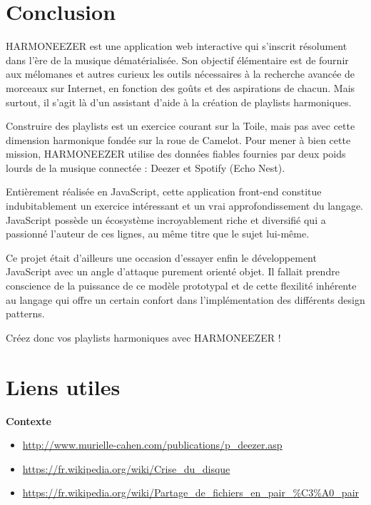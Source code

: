 \documentclass[a4paper,12pt]{article}
\begin{document}
\part*{Conclusion}

HARMONEEZER est une application web interactive qui s'inscrit résolument dans l'ère de la musique dématérialisée. Son objectif élémentaire est de fournir aux mélomanes et autres curieux les outils nécessaires à la recherche avancée de morceaux sur Internet, en fonction des goûts et des aspirations de chacun. Mais surtout, il s'agit là d'un assistant d'aide à la création de playlists harmoniques.

Construire des playlists est un exercice courant sur la Toile, mais pas avec cette dimension harmonique fondée sur la roue de Camelot. Pour mener à bien cette mission, HARMONEEZER utilise des données fiables fournies par deux poids lourds de la musique connectée : Deezer et Spotify (Echo Nest).

Entièrement réalisée en JavaScript, cette application front-end constitue indubitablement un exercice intéressant et un vrai approfondissement du langage. JavaScript possède un écosystème incroyablement riche et diversifié qui a passionné l'auteur de ces lignes, au même titre que le sujet lui-même.

Ce projet était d'ailleurs une occasion d'essayer enfin le développement JavaScript avec un angle d'attaque purement orienté objet. Il fallait prendre conscience de la puissance de ce modèle prototypal et de cette flexilité inhérente au langage qui offre un certain confort dans l'implémentation des différents design patterns.

Créez donc vos playlists harmoniques avec HARMONEEZER !

\newpage

\part*{Liens utiles}

\textbf{Contexte}

\begin{itemize}
 \item{\url{http://www.murielle-cahen.com/publications/p_deezer.asp}}
 \item{\url{https://fr.wikipedia.org/wiki/Crise_du_disque}}
 \item{\url{https://fr.wikipedia.org/wiki/Partage\_de\_fichiers\_en\_pair\_\%C3\%A0\_pair}}
\end{itemize}
\end{document}
